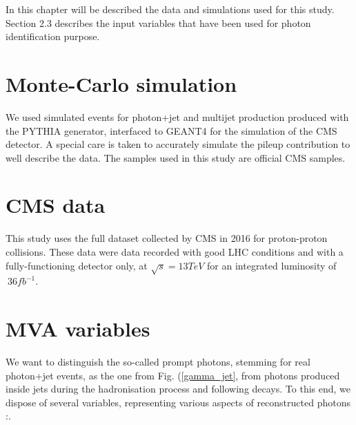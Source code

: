 \label{sec:unchapitre}

In this chapter will be described the data and simulations used for this study. Section 2.3 describes the input
variables that have been used for photon identification purpose.

\section{Monte-Carlo simulation}

We used simulated events for photon+jet and multijet production produced with the PYTHIA generator, interfaced to GEANT4 
for the simulation of the CMS detector. A special care is taken to accurately simulate the pileup contribution to well 
describe the data. The samples used in this study are official CMS samples.

\section{CMS data}

This study uses the full dataset collected by CMS in 2016 for proton-proton collisions. These data were data recorded with good 
LHC conditions and with a fully-functioning detector only, at $\sqrt{s} = 13 TeV$ for an integrated luminosity of $~ 36
fb^{-1}$.
 
\section{MVA variables}

We want to distinguish the so-called prompt photons, stemming for real photon+jet events, as the one from Fig.
(\ref{gamma_jet}, from photons produced inside jets during the hadronisation process and following decays. 
To this end, we dispose of several variables, representing various aspects of reconstructed photons\cite{CMS2015} :.

